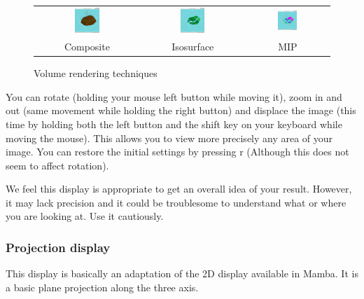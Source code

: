 \documentclass[a4paper,10pt,oneside]{article}
\begin{document}
\begin{figure}
\centering
\begin{tabular}{ccc}
\includegraphics[width=0.25\textwidth]{display_compo.png} & 
\includegraphics[width=0.25\textwidth]{display_isosurface.png} &
\includegraphics[width=0.25\textwidth]{display_mip.png} \\ 
Composite &
Isosurface &
MIP \\ 
\end{tabular}
\caption{Volume rendering techniques}
\label{fig:dis_method}
\end{figure}

You can rotate (holding your mouse left button while moving it), zoom in and
out (same movement while holding the right button) and displace the image
(this time by holding both the left button and the shift key on your keyboard
while moving the mouse). This allows you to view more precisely any area of
your image. You can restore the initial settings by pressing r (Although this
does not seem to affect rotation).

We feel this display is appropriate to get an overall idea of your
result. However, it may lack precision and it could be troublesome to
understand what or where you are looking at. Use it cautiously.

\subsubsection{Projection display}
This display is basically an adaptation of the 2D display available in Mamba.
It is a basic plane projection along the three axis.
\end{document}
